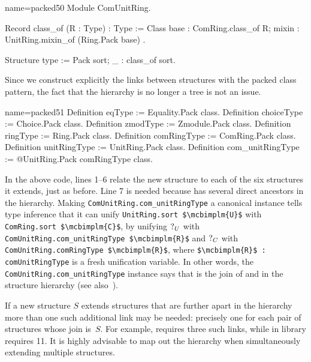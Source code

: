 \begin{coq}{name=packed50}{}
Module ComUnitRing.

Record class_of (R : Type) : Type := Class {
  base : ComRing.class_of R;
  mixin : UnitRing.mixin_of (Ring.Pack base)
}.

Structure type := Pack {sort; _ : class_of sort}.
\end{coq}

Since we construct explicitly the links between structures with the
packed class pattern, the fact that the hierarchy is no longer a tree
is not an issue.

\begin{coq}{name=packed51}{}
Definition eqType := Equality.Pack class.
Definition choiceType := Choice.Pack class.
Definition zmodType := Zmodule.Pack class.
Definition ringType := Ring.Pack class.
Definition comRingType := ComRing.Pack class.
Definition unitRingType := UnitRing.Pack class.
Definition com_unitRingType := @UnitRing.Pack comRingType class.
\end{coq}

In the above code, lines 1--6 relate the new structure to each of the
six structures it
extends, just as before. Line 7 is needed because 
has several direct ancestors in the hierarchy.  Making
\lstinline/ComUnitRing.com_unitRingType/ a canonical 
instance tells type inference that it can unify
\lstinline/UnitRing.sort $\mcbimplm{U}$/ with
\lstinline/ComRing.sort $\mcbimplm{C}$/, by unifying $\mbox{?}_{U}$ with
\lstinline/ComUnitRing.com_unitRingType $\mcbimplm{R}$/ and
$\mbox{?}_{C}$ with
\lstinline/ComUnitRing.comRingType $\mcbimplm{R}$/,
where \lstinline/$\mcbimplm{R}$ : comUnitRingType/
is a fresh unification variable.
In other words, the \lstinline/ComUnitRing.com_unitRingType/ instance
says that  is the join of
 and  in the structure hierarchy (see
also~\cite[section 5]{mahboubi:hal-00816703}).

If a new structure $S$ extends structures that are further apart in
the hierarchy more than one such additional link may be needed:
precisely one for each pair of structures whose join is~$S$. For example,
 requires three such links, while
 in library  requires 11. It is highly
advisable to map out the hierarchy when simultaneously extending
multiple structures.


